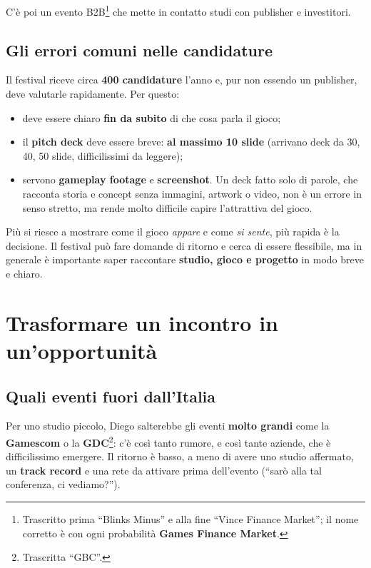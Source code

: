C'è poi un evento B2B\footnote{Trascritto prima ``Blinks Minus'' e alla fine
``Vince Finance Market''; il nome corretto è con ogni probabilità \textbf{Games
Finance Market}.} che mette in contatto studi con publisher e investitori.

\subsection{Gli errori comuni nelle candidature}

Il festival riceve circa \textbf{400 candidature} l'anno e, pur non essendo un
publisher, deve valutarle rapidamente. Per questo:
\begin{itemize}
  \item deve essere chiaro \textbf{fin da subito} di che cosa parla il gioco;
  \item il \textbf{pitch deck} deve essere breve: \textbf{al massimo 10 slide}
        (arrivano deck da 30, 40, 50 slide, difficilissimi da leggere);
  \item servono \textbf{gameplay footage} e \textbf{screenshot}. Un deck fatto solo
        di parole, che racconta storia e concept senza immagini, artwork o video,
        non è un errore in senso stretto, ma rende molto difficile capire
        l'attrattiva del gioco.
\end{itemize}
Più si riesce a mostrare come il gioco \emph{appare} e come \emph{si sente}, più
rapida è la decisione. Il festival può fare domande di ritorno e cerca di essere
flessibile, ma in generale è importante saper raccontare \textbf{studio, gioco e
progetto} in modo breve e chiaro.

\section{Trasformare un incontro in un'opportunità}
\label{sec:c3-1-incontro}

\subsection{Quali eventi fuori dall'Italia}

Per uno studio piccolo, Diego salterebbe gli eventi \textbf{molto grandi} come la
\textbf{Gamescom} o la \textbf{GDC}\footnote{Trascritta ``GBC''.}: c'è così tanto
rumore, e così tante aziende, che è difficilissimo emergere. Il ritorno è basso, a
meno di avere uno studio affermato, un \textbf{track record} e una rete da attivare
prima dell'evento (``sarò alla tal conferenza, ci vediamo?'').


